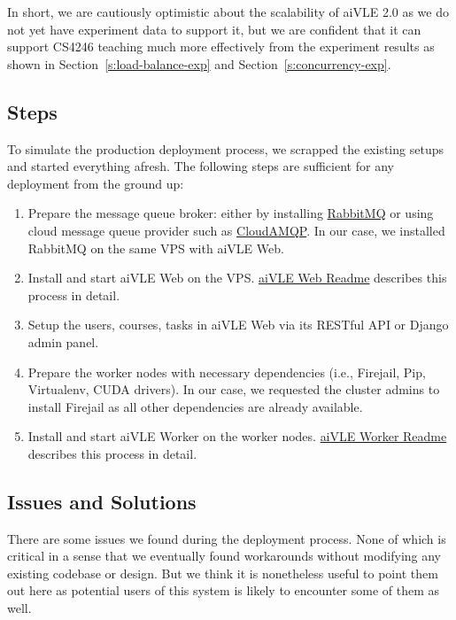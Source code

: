 In short, we are cautiously optimistic about the scalability of aiVLE 2.0 as we do not yet have experiment data to support it, but we are confident that it can support CS4246 teaching much more effectively from the experiment results as shown in Section~\ref{s:load-balance-exp} and Section~\ref{s:concurrency-exp}.

\subsection{Steps}
To simulate the production deployment process, we scrapped the existing setups and started everything afresh. The following steps are sufficient for any deployment from the ground up:

\begin{enumerate}
    \item Prepare the message queue broker: either by installing \href{https://www.rabbitmq.com/}{RabbitMQ} or using cloud message queue provider such as \href{https://www.cloudamqp.com/}{CloudAMQP}. In our case, we installed RabbitMQ on the same VPS with aiVLE Web.
    \item Install and start aiVLE Web on the VPS.  \href{https://github.com/edu-ai/aivle-web#readme}{aiVLE Web Readme} describes this process in detail.
    \item Setup the users, courses, tasks in aiVLE Web via its RESTful API or Django admin panel.
    \item Prepare the worker nodes with necessary dependencies (i.e., Firejail, Pip, Virtualenv, CUDA drivers). In our case, we requested the cluster admins to install Firejail as all other dependencies are already available.
    \item Install and start aiVLE Worker on the worker nodes. \href{https://github.com/edu-ai/aivle-worker#readme}{aiVLE Worker Readme} describes this process in detail.
\end{enumerate}

\subsection{Issues and Solutions}
There are some issues we found during the deployment process. None of which is critical in a sense that we eventually found workarounds without modifying any existing codebase or design. But we think it is nonetheless useful to point them out here as potential users of this system is likely to encounter some of them as well.

